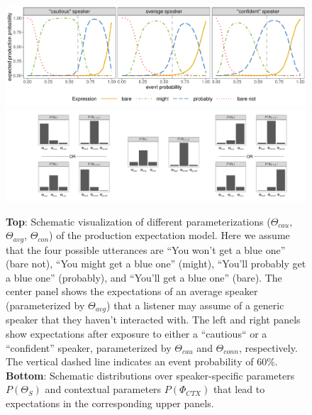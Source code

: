 \documentclass[man,floatsintext]{apa6}
\begin{document}
\begin{figure}[th!]
    \centering

    \includegraphics[width=\columnwidth]{model-visualization-predictions.pdf}
     \includegraphics[width=\columnwidth]{distribution-combinations.png}
    \caption{\textbf{Top}: Schematic visualization of different parameterizations ($\Theta_{cau}$, $\Theta_{avg}$, $\Theta_{con}$) of the production expectation model. Here we assume that the four possible utterances are ``You won't get a blue one'' (bare not), ``You might get a blue one'' (might), ``You'll probably get a blue one'' (probably), and ``You'll get a blue one'' (bare). The center panel shows the expectations of an average speaker (parameterized by $\Theta_{avg}$) that a listener may assume of a generic speaker that they haven't interacted with. The left and right panels show expectations after exposure to either a ``cautious`` or a ``confident'' speaker, parameterized by $\Theta_{cau}$ and $\Theta_{conn}$, respectively. The vertical dashed line indicates an event probability of 60\%. \\
    \textbf{Bottom}: Schematic distributions over speaker-specific parameters $P(\Theta_S)$ and contextual parameters $P(\Phi_{CTX})$ that lead to expectations in the corresponding upper panels. }
    \label{fig:model-viz}
\end{figure}
\end{document}

